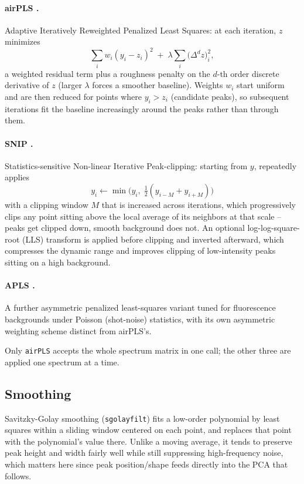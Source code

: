 \documentclass[11pt,a4paper]{article}
\newcommand{\code}[1]{\texttt{#1}}
\begin{document}
\paragraph{airPLS \cite{Zhang2010}.} Adaptive Iteratively Reweighted
Penalized Least Squares: at each iteration, $z$ minimizes
\[
  \sum_i w_i (y_i - z_i)^2 \;+\; \lambda \sum_i \big(\Delta^d z\big)_i^2 ,
\]
a weighted residual term plus a roughness penalty on the $d$-th order
discrete derivative of $z$ (larger $\lambda$ forces a smoother baseline).
Weights $w_i$ start uniform and are then reduced for points where $y_i>z_i$
(candidate peaks), so subsequent iterations fit the baseline increasingly
around the peaks rather than through them.

\paragraph{SNIP \cite{Ryan1988}.} Statistics-sensitive Non-linear Iterative
Peak-clipping: starting from $y$, repeatedly applies
\[
  y_i \leftarrow \min\!\big(y_i,\; \tfrac{1}{2}(y_{i-M}+y_{i+M})\big)
\]
with a clipping window $M$ that is increased across iterations, which
progressively clips any point sitting above the local average of its
neighbors at that scale -- peaks get clipped down, smooth background does
not. An optional log-log-square-root (LLS) transform is applied before
clipping and inverted afterward, which compresses the dynamic range and
improves clipping of low-intensity peaks sitting on a high background.

\paragraph{APLS \cite{Cadusch2013}.} A further asymmetric penalized
least-squares variant tuned for fluorescence backgrounds under Poisson
(shot-noise) statistics, with its own asymmetric weighting scheme distinct
from airPLS's.

Only \code{airPLS} accepts the whole spectrum matrix in one call; the other
three are applied one spectrum at a time.

\subsection{Smoothing}
\label{sec:smoothing}
Savitzky-Golay smoothing (\code{sgolayfilt}) fits a low-order polynomial by
least squares within a sliding window centered on each point, and replaces
that point with the polynomial's value there. Unlike a moving average, it
tends to preserve peak height and width fairly well while still suppressing
high-frequency noise, which matters here since peak position/shape feeds
directly into the PCA that follows.
\end{document}
